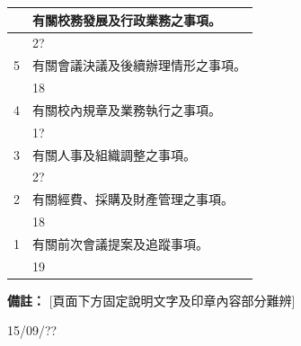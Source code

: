 \documentclass[UTF8,10pt,a4paper,fontset=fandol]{ctexart}
\newcommand{\fieldvalue}[1]{#1}
\newcommand{\handwritten}[1]{#1}
\begin{document}
\begin{tabularx}{\textwidth}{|>{\RaggedRight\arraybackslash}p{}|X|}
6 &
有關校務發展及行政業務之事項。\\
\cline{1-2}
&
\fieldvalue{\handwritten{2?}}\\
\hline

5 &
有關會議決議及後續辦理情形之事項。\\
\cline{1-2}
&
\fieldvalue{\handwritten{18}}\\
\hline

4 &
有關校內規章及業務執行之事項。\\
\cline{1-2}
&
\fieldvalue{\handwritten{1?}}\\
\hline

3 &
有關人事及組織調整之事項。\\
\cline{1-2}
&
\fieldvalue{\handwritten{2?}}\\
\hline

2 &
有關經費、採購及財產管理之事項。\\
\cline{1-2}
&
\fieldvalue{\handwritten{18}}\\
\hline

1 &
有關前次會議提案及追蹤事項。\\
\cline{1-2}
&
\fieldvalue{\handwritten{19}}\\
\hline
\end{tabularx}

\vspace{4pt}

\noindent
\textbf{備註：} [頁面下方固定說明文字及印章內容部分難辨]

\fieldvalue{\handwritten{15/09/??}}


\newpage

\end{document}

